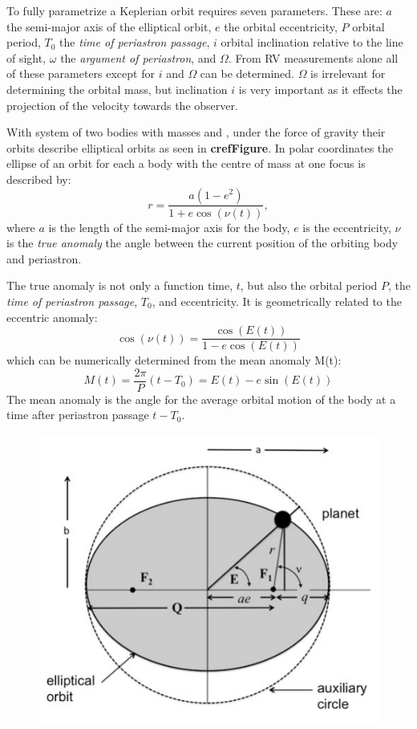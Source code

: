 To fully parametrize a Keplerian orbit requires seven parameters.
These are: $a$ the semi-major axis of the elliptical orbit, $e$ the orbital eccentricity, $P$ orbital period, $T_0$ the \emph{time of periastron passage}, $i$ orbital inclination relative to the line of sight, $\omega$ the \emph{argument of periastron}, and $\Omega$.
From RV measurements alone all of these parameters except for $i$ and $\Omega$ can be determined.
$\Omega$ is irrelevant for determining the orbital mass, but inclination $i$ is very important as it effects the projection of the velocity towards the observer.

With system of two bodies with masses \Mone{} and \Mtwo{}, under the force of gravity their orbits describe elliptical orbits as seen in \textbf{cref{Figure}}.
In polar coordinates the ellipse of an orbit for each a body with the centre of mass at one focus is described by:
\begin{equation}
    r = \frac{a(1-e^{2})}{1 + e \cos(\nu(t))},
\end{equation}
where $a$ is the length of the semi-major axis for the body, $e$ is the eccentricity, $\nu$ is the \emph{true anomaly} the angle between the current position of the orbiting body and periastron.

The true anomaly is not only a function time, \(t\), but also the orbital period \(P\), the \emph{time of periastron passage}, \(T_0\), and eccentricity.
It is geometrically related to the eccentric anomaly:
\begin{equation}
\cos(\nu(t)) = \frac{\cos(E(t))}{1 - e \cos(E(t))}
\end{equation} 
which can be numerically determined from the mean anomaly M(t):
\begin{equation}
M(t) = \frac{2 \pi}{P}(t - T_0) = E(t) - e \sin(E(t))
\end{equation}
The mean anomaly is the angle for the average orbital motion of the body at a time after periastron passage \(t-T_0\).

\begin{figure}
    \centering
    \includegraphics[width=0.7\linewidth]{figures/fundamental_rv/eclipes_orbit}
    \caption{}
    \label{fig:eclipesorbit}
\end{figure}



